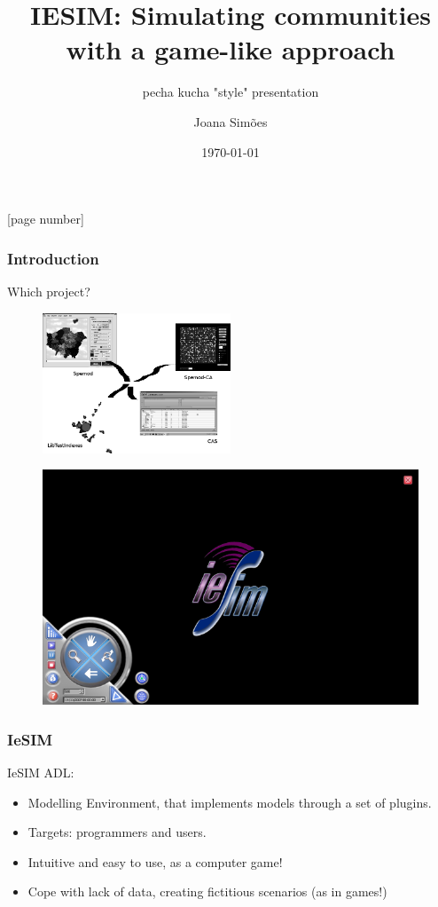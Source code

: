 \documentclass[hyperref={pdfpagelabels=true}]{beamer}
\title{IESIM: Simulating communities with a game-like approach}
\subtitle{pecha kucha "style" presentation}
\author{Joana Sim\~{o}es}
\date{\today}
\begin{document}
[page number]
\begin{frame}
\titlepage
\end{frame} 
 
\begin{frame}
\frametitle{Introduction}
\begin{overprint}
Which project?
\begin{figure}
\includegraphics[width=0.5\textwidth]{projects2.png}
\end{figure}
    \begin{figure}
    \includegraphics[scale=0.15]{initial_screen.png}
    \end{figure}
\end{overprint}
\end{frame}

\begin{frame}
\frametitle{IeSIM}
IeSIM ADL:
\begin{itemize}
\item Modelling Environment, that implements models through a set of plugins.
\item Targets: programmers and users.
\item Intuitive and easy to use, as a computer game!
\item Cope with lack of data, creating fictitious scenarios (as in games!)
\end{itemize}
\end{frame}
\end{document}
